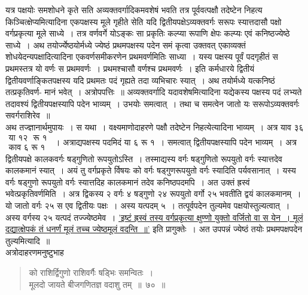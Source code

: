 \documentclass[11pt, openany]{book}
\begin{document}
 यत्र पक्षयोः समशोधने कृते सति अव्यक्तवर्गादिकमवशेषं भवति 
तत्र पूर्ववत्पक्षौ तदेष्टेन निहत्य किञ्चित्क्षेप्यमित्यादिना
एकपक्षस्य मूले गृहीते सेति यदि द्वितीयपक्षेऽव्यक्तवर्गः सरूपः स्यात्तदासौ पक्षो
वर्गप्रकृत्या मूले साध्ये~। तत्र वर्णवर्गे योऽङ्कः सा प्रकृतिः कल्प्या रूपाणि क्षेपः 
कल्प्यः एवं कनिष्ठज्येष्ठे साध्ये~। अथ तयोर्ज्येष्ठयोर्मध्ये ज्येष्ठं
प्रथमपक्षस्य पदेन समं कृत्वा उक्तवत् एकाव्यक्तं शोधयेदन्यपक्षादित्यादिना एकवर्णसमीकरणेन प्रथमवर्णमितिः साध्या~। यस्य पक्षस्य पूर्वं पदगृहीतं स 
प्रथमस्तत्र यो वर्णः स प्रथमवर्णः~। प्रथमश्चासौ वर्णश्च प्रथमवर्णः~।
इति कर्मधारये द्वितीयं द्वितीयवर्णाङ्कितपक्षस्य यदि प्रथमतः पदं गृह्यते
तदा व्यभिचारः स्यात्~। अथ तयोर्मध्ये यत्कनिष्ठं तत्प्रकृतिवर्ण-
\newpage
\noindent मानं भवेत्~। अत्रोपपत्तिः~॥ अव्यक्तवर्गादि यदावशेषमित्यादिना यद्येकस्य पक्षस्य पदं लभ्यते तदावश्यं द्वितीयपक्षस्यापि पदेन भाव्यम्~। 
उभयोः समत्वात्~। तथा च समत्वेन जातो यः सरूपोऽव्यक्तवर्गः 
सवर्गराशिरेव~॥ \\

\vspace{-3mm}
 अथ तज्ज्ञानार्थमुपायः~। स यथा~। वक्ष्यमाणोदाहरणे पक्षौ 
तदेष्टेन निहत्येत्यादिना भाव्यम्~। अत्र याव ३६ $\begin{matrix}
\mbox{या १२ ~रू १}\\
\mbox{काव ६ रू १}
\end{matrix}$~। अत्राद्यपक्षस्य पदमिदं या ६ रू १~। समत्वात् द्वितीयपक्षस्यापि पदेन भाव्यम्~। अत्र द्वितीयपक्षे कालकवर्गः षड्गुणितो रूपयुतोऽस्ति~। 
तस्माद्यस्य वर्गः षड्गुणितो रूपयुतो वर्गः स्यात्तदेव कालकमानं 
स्यात्~। अयं तु वर्गप्रकृते र्विषयः को वर्गः षड्गुणरूपयुतो 
वर्गः स्यादिति पर्यवसानात्~। यस्य वर्गः षड्गुणो रूपयुतो वर्गः 
स्यात्तदिह कालकमानं तदेव कनिष्ठपदमपि~। अत उक्तं ह्रस्वं 
भवेत्प्रकृतिवर्णमिति~। अत्र द्विकस्य २ वर्गः ४ षड्गुणो २४ रूपयुतो 
वर्गो २५ भवतीति द्वयं कालकमानम्~। यो जातो वर्गः २५ स एव 
द्वितीयः पक्षः~। अस्य यत्पदम् ५~। तत्पूर्वपदेन तुल्यमेव पक्षयोस्तुल्यत्वात्~। अस्य वर्गस्य २५ यत्पदं तज्ज्येष्ठमेव~। \hyperref[39]{'इष्टं ह्रस्वं तस्य वर्गप्रकृत्या क्षुण्णो युक्तो वर्जितो वा स येन~। मूलं दद्यात्क्षेपकं तं धनर्णं 
मूलं तच्च ज्येष्ठमूलं वदन्ति~॥'} इति प्रागुक्तेः~। अत उपपन्नं ज्येष्ठं 
तयोः प्रथमपक्षपदेन तुल्यमित्यादि~॥ \\

\vspace{-3mm}
 अत्रोदाहरणमनुष्टुभाह\textendash 
\begin{quote}
    \ex
     को राशिर्द्विगुणो राशिवर्गैः षड्भिः समन्वितः~। \\
 मूलदो जायते बीजगणितज्ञ वदाशु तम्~॥~७०~॥~
\end{quote}
\end{document}

